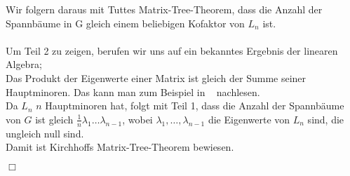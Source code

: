 Wir folgern daraus mit Tuttes Matrix-Tree-Theorem, dass die Anzahl der Spannbäume in G gleich einem beliebigen Kofaktor von $L_n$ ist.\\ \\
Um Teil 2 zu zeigen, berufen wir uns auf ein bekanntes Ergebnis der linearen Algebra; \\
Das Produkt der Eigenwerte einer Matrix ist gleich der Summe seiner Hauptminoren. Das kann man zum Beispiel in ~\cite{meyer_2005} nachlesen. \\
Da $L_n$ $n$ Hauptminoren hat, folgt mit Teil 1, dass die Anzahl der Spannbäume von $G$ ist gleich $\frac{1}{n}\lambda_1\ldots\lambda_{n-1}$, wobei $\lambda_1,\ldots,\lambda_{n-1}$ die Eigenwerte von $L_n$ sind, die ungleich null sind. \\
Damit ist Kirchhoffs Matrix-Tree-Theorem bewiesen.
\begin{flushright} $\Box$ \end{flushright} 
 
